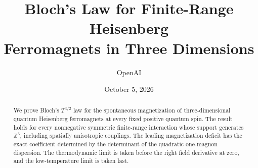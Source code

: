 \documentclass[11pt]{article}
\title{Bloch's Law for Finite-Range Heisenberg\\Ferromagnets in Three Dimensions}
\author{OpenAI}
\date{October 5, 2026}
\numberwithin{equation}{section}
\theoremstyle{definition}
\theoremstyle{remark}
\newcommand{\Z}{\mathbb Z}
\begin{document}
\maketitle
\begin{abstract}
We prove Bloch's $T^{3/2}$ law for the spontaneous magnetization of
three-dimensional quantum Heisenberg ferromagnets at every fixed positive
quantum spin. The result holds for every nonnegative symmetric finite-range
interaction whose support generates $\Z^3$, including spatially anisotropic
couplings. The leading magnetization deficit has the exact coefficient
determined by the determinant of the quadratic one-magnon dispersion.
The thermodynamic limit is taken before the right field derivative at zero,
and the low-temperature limit is taken last.
\end{abstract}
\tableofcontents








\end{document}
